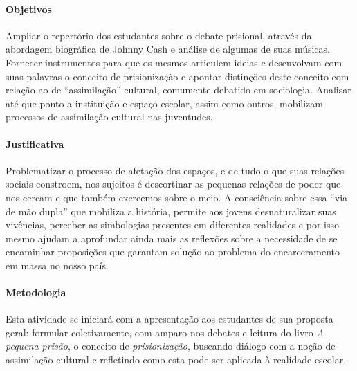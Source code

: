 \documentclass[11pt]{extarticle}
\begin{document}
\paragraph{Objetivos} Ampliar o repertório dos estudantes sobre o debate
prisional, através da abordagem biográfica de Johnny Cash e análise de
algumas de suas músicas. Fornecer instrumentos para que os mesmos
articulem ideias e desenvolvam com suas palavras o conceito de
prisionização e apontar distinções deste conceito com relação ao de
``assimilação'' cultural, comumente debatido em sociologia. Analisar até
que ponto a instituição e espaço escolar, assim como outros, mobilizam
processos de assimilação cultural nas juventudes.

\paragraph{Justificativa} Problematizar o processo de afetação dos
espaços, e de tudo o que suas relações sociais constroem, nos sujeitos é
descortinar as pequenas relações de poder que nos cercam e que também
exercemos sobre o meio. A consciência sobre essa ``via de mão dupla''
que mobiliza a história, permite aos jovens desnaturalizar suas
vivências, perceber as simbologias presentes em diferentes realidades e
por isso mesmo ajudam a aprofundar ainda mais as reflexões sobre a
necessidade de se encaminhar proposições que garantam solução ao
problema do encarceramento em massa no nosso país.

\paragraph{Metodologia} 

 Esta atividade se iniciará com a apresentação aos
estudantes de sua proposta geral: formular coletivamente, com amparo nos
debates e leitura do livro \emph{A pequena prisão}, o conceito de
\emph{prisionização}, buscando diálogo com a noção de assimilação cultural e
refletindo como esta pode ser aplicada à realidade escolar. 
\end{document}
